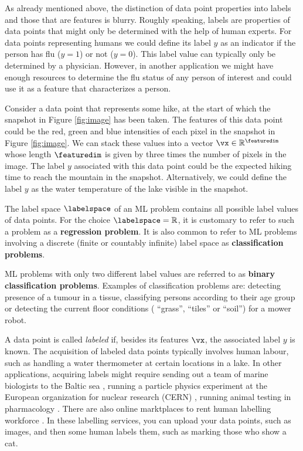 \documentclass[12pt]{report}
\newcommand{\featurelen}{\featuredim}
\begin{document}
As already mentioned above, the distinction of data point properties into 
labels and those that are features is blurry. Roughly speaking, labels are 
properties of data points that might only be determined with the help of 
human experts. For data points representing humans we could define 
its label $y$ as an indicator if the person has flu ($y=1$) or not ($y=0$). 
This label value can typically only be determined by a physician. However, 
in another application we might have enough resources to determine the 
flu status of any person of interest and could use it as a feature that 
characterizes a person. 

Consider a data point that represents some hike, at the start of 
which the snapshot in Figure \ref{fig:image} has been taken. The 
features of this data point could be the red, green and blue intensities 
of each pixel in the snapshot in Figure \ref{fig:image}. We can stack 
these values into a vector $\vx \in \mathbb{R}^{\featurelen}$ whose 
length $\featurelen$ is given by three times the number of pixels in 
the image. The label $y$ associated with this data point could be 
the expected hiking time to reach the mountain in the snapshot. 
Alternatively, we could define the label $y$ as the water temperature 
of the lake visible in the snapshot. 

The label space $\labelspace$ of an ML problem contains all possible label values 
of data points. For the choice $\labelspace = \mathbb{R}$, it is customary to refer 
to such a problem as a {\bf regression problem}. It is also common to refer to ML 
problems involving a discrete (finite or countably infinite) label space as {\bf classification problems}. 

ML problems with only two different label values are referred to as 
{\bf binary classification problems}. Examples of classification 
problems are: detecting presence of a tumour in a tissue, classifying 
persons according to their age group or detecting the current floor 
conditions ( ``grass'', ``tiles'' or ``soil'') for a mower robot. 



A data point is called \emph{labeled} if, besides its features $\vx$, the associated label $y$ is known.
The acquisition of labeled data points typically involves human labour, such as handling a water 
thermometer at certain locations in a lake. In other applications, acquiring labels 
might require sending out a team of marine biologists to the Baltic sea \cite{MLMarineBiology}, 
running a particle physics experiment at the European organization for nuclear research (CERN) \cite{MLCERN}, 
running animal testing in pharmacology \cite{MLPharma}. There are also online marktplaces to rent human labelling workforce \cite{Mort2018}. 
In these labelling services, you can upload your data points, such as images, and then 
some human labels them, such as marking those who show a cat. 
\end{document}
